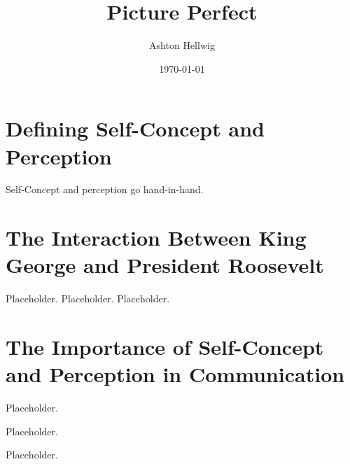 \documentclass[stu,12pt]{apa7}
\title{%
    Picture Perfect
  }
\author{Ashton Hellwig}
\date{\today}
\begin{document}
  \maketitle

  \section{Defining Self-Concept and Perception}
    Self-Concept and perception go hand-in-hand.


  \section{The Interaction Between King George and President Roosevelt}
    Placeholder.
    Placeholder.
    Placeholder.


  \section{The Importance of Self-Concept and Perception in Communication}
    Placeholder.

    Placeholder.

    Placeholder.


  \newpage
  \nocite{michell_hyde_2012}
  \printbibliography[%
    title={Works Cited},%
    heading={bibintoc},%
    notcategory={consulted}%
  ]

  \newpage
  \nocite{*}
  \printbibliography[%
    title={Works Consulted},%
    heading={bibintoc},%
    category={consulted}%
  ]
\end{document}
